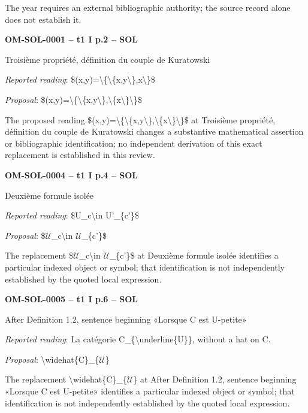The year requires an external bibliographic authority; the source record alone does not establish it.\par
\par\noindent\textbf{OM-SOL-0001 -- t1 I p.2 -- SOL}\par
Troisième propriété, définition du couple de Kuratowski\par
\emph{Reported reading}: \$(x,y)=\allowbreak \textbackslash{}\{\textbackslash{}\{x,y\textbackslash{}\},x\textbackslash{}\}\$\par
\emph{Proposal}: \$(x,y)=\allowbreak \textbackslash{}\{\textbackslash{}\{x,y\textbackslash{}\},\textbackslash{}\{x\textbackslash{}\}\textbackslash{}\}\$\par
The proposed reading \$(x,y)=\allowbreak \textbackslash{}\{\textbackslash{}\{x,y\textbackslash{}\},\textbackslash{}\{x\textbackslash{}\}\textbackslash{}\}\$ at Troisième propriété, définition du couple de Kuratowski changes a substantive mathematical assertion or bibliographic identification; no independent derivation of this exact replacement is established in this review.\par
\par\noindent\textbf{OM-SOL-0004 -- t1 I p.4 -- SOL}\par
Deuxième formule isolée\par
\emph{Reported reading}: \$U\_c\textbackslash{}in U'\_\{c'\}\$\par
\emph{Proposal}: \$\ensuremath{𝒰}\_c\textbackslash{}in \ensuremath{𝒰}\_\{c'\}\$\par
The replacement \$\ensuremath{𝒰}\_c\textbackslash{}in \ensuremath{𝒰}\_\{c'\}\$ at Deuxième formule isolée identifies a particular indexed object or symbol; that identification is not independently established by the quoted local expression.\par
\par\noindent\textbf{OM-SOL-0005 -- t1 I p.6 -- SOL}\par
After Definition 1.2, sentence beginning «Lorsque C est U-petite»\par
\emph{Reported reading}: La catégorie C\_\{\textbackslash{}underline\{U\}\}, without a hat on C.\par
\emph{Proposal}: \textbackslash{}widehat\{C\}\_\{\ensuremath{𝒰}\}\par
The replacement \textbackslash{}widehat\{C\}\_\{\ensuremath{𝒰}\} at After Definition 1.2, sentence beginning «Lorsque C est U-petite» identifies a particular indexed object or symbol; that identification is not independently established by the quoted local expression.\par
